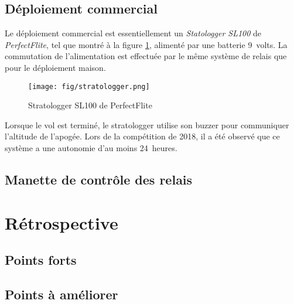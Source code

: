 \subsection{Déploiement commercial}

Le déploiement commercial est essentiellement un \textit{Statologger SL100}
de \textit{PerfectFlite}, tel que montré à la figure \ref{f:stratologger},
alimenté par une batterie 9~volts. La commutation de l'alimentation est
effectuée par le même système de relais que pour le déploiement maison.

\begin{figure}[H]
	\center
	\texttt{[image: fig/stratologger.png]}
	\caption{Stratologger SL100 de PerfectFlite}
	\label{f:stratologger}
\end{figure}

Lorsque le vol est terminé, le stratologger utilise son buzzer pour communiquer
l'altitude de l'apogée. Lors de la compétition de 2018, il a été observé que
ce système a une autonomie d'au moins 24~heures. 

\subsection{Manette de contrôle des relais}



\section{Rétrospective}

\subsection{Points forts}



\subsection{Points à améliorer}
